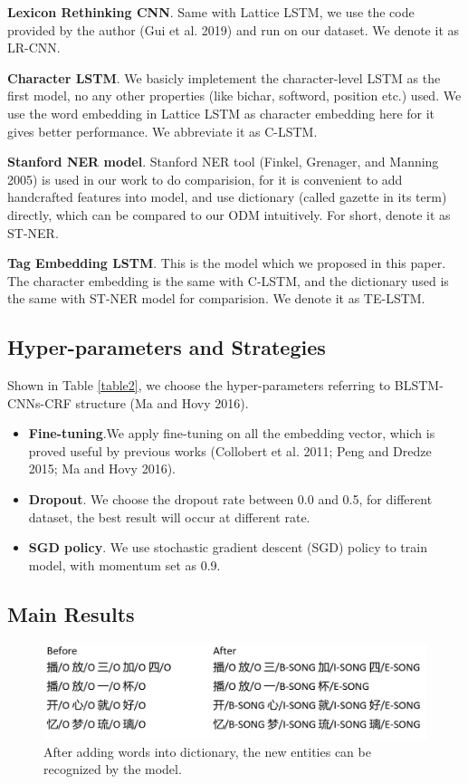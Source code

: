 \documentclass[letterpaper]{article} %
\begin{document}
\textbf{Lexicon Rethinking CNN}. Same with Lattice LSTM, we use the code provided by the author (Gui et al. 2019) and run on our dataset. We denote it as LR-CNN.

\textbf{Character LSTM}. We basicly impletement the character-level LSTM as the first model, no any other properties (like bichar, softword, position etc.) used. We use the word embedding in Lattice LSTM as character embedding here for it gives better performance. We abbreviate it as C-LSTM.

\textbf{Stanford NER model}. Stanford NER tool (Finkel, Grenager, and Manning 2005) is used in our work to do comparision, for it is convenient to add handcrafted features into model, and use dictionary (called gazette in its term) directly, which can be compared to our ODM intuitively. For short, denote it as ST-NER. 

\textbf{Tag Embedding LSTM}. This is the model which we proposed in this paper. The character embedding is the same with C-LSTM, and the dictionary used is the same with ST-NER model for comparision. We denote it as TE-LSTM.

\subsection{Hyper-parameters and Strategies}

Shown in Table \ref{table2}, we choose the hyper-parameters referring to BLSTM-CNNs-CRF structure (Ma and Hovy 2016). 

\begin{itemize}
\item \textbf{Fine-tuning}.We apply fine-tuning on all the embedding vector, which is proved useful by previous works (Collobert et al. 2011; Peng and Dredze 2015; Ma and Hovy 2016). 
\item \textbf{Dropout}. We choose the dropout rate between 0.0 and 0.5, for different dataset, the best result will occur at different rate.
\item \textbf{SGD policy}. We use stochastic gradient descent (SGD) policy to train model, with momentum set as 0.9.
\end{itemize}

\subsection{Main Results}



\begin{figure}[t]
\centering
\includegraphics[width=0.8\columnwidth]{change_after_adding_song} %
\caption{After adding words into dictionary, the new entities can be recognized by the model.}
\label{fig3}
\end{figure}
\end{document}
